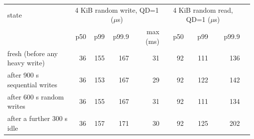 \begin{tabular}{lrrrrrrrr}
\toprule
state & \multicolumn{4}{c}{4 KiB random write, QD=1 ($\mu$s)} & \multicolumn{3}{c}{4 KiB random read, QD=1 ($\mu$s)} \\
 & p50 & p99 & p99.9 & max (ms) & p50 & p99 & p99.9 \\
\midrule
fresh (before any heavy write) & 36 & 155 & 167 & 31 & 92 & 111 & 136 \\
after 900 s sequential writes & 36 & 153 & 167 & 29 & 92 & 122 & 142 \\
after 600 s random writes & 36 & 155 & 167 & 31 & 92 & 111 & 134 \\
after a further 300 s idle & 36 & 157 & 171 & 30 & 92 & 125 & 202 \\
\bottomrule
\end{tabular}
